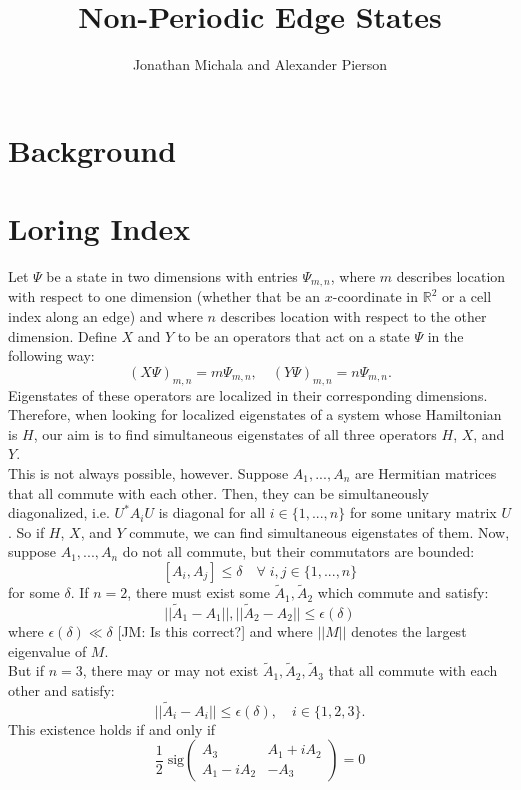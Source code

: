 \documentclass[a4paper]{article}
\title{Non-Periodic Edge States}
\author{Jonathan Michala and Alexander Pierson}
\newcommand{\jm}[1]{{\color{red} [JM: #1]}}
\begin{document}
\maketitle

\section{Background}
\section{Loring Index}
Let $\Psi$ be a state in two dimensions with entries $\Psi_{m,n}$, where $m$ describes location with respect to one dimension (whether that be an $x$-coordinate in $\mathbb{R}^2$ or a cell index along an edge) and where $n$ describes location with respect to the other dimension.
Define $X$ and $Y$ to be an operators that act on a state $\Psi$ in the following way:
$$(X \Psi)_{m,n} = m\Psi_{m,n}, \quad (Y \Psi)_{m,n} = n\Psi_{m,n}.$$
Eigenstates of these operators are localized in their corresponding dimensions.
Therefore, when looking for localized eigenstates of a system whose Hamiltonian is $H$, our aim is to find simultaneous eigenstates of all three operators $H$, $X$, and $Y$.\\
This is not always possible, however.
Suppose $A_1,...,A_n$ are Hermitian matrices that all commute with each other.
Then, they can be simultaneously diagonalized, i.e. $U^* A_i U$ is diagonal for all $i \in \{1,...,n\}$ for some unitary matrix $U$.
So if $H$, $X$, and $Y$ commute, we can find simultaneous eigenstates of them.
Now, suppose $A_1,...,A_n$ do not all commute, but their commutators are bounded:
$$[A_i,A_j] \leq \delta \quad \forall\; i,j \in \{1,...,n\}$$
for some $\delta$.
If $n = 2$, there must exist some $\widetilde{A}_1, \widetilde{A}_2$ which commute and satisfy:
$$||\widetilde{A}_1 - A_1||, ||\widetilde{A}_2 - A_2|| \leq \epsilon(\delta)$$
where $\epsilon(\delta) \ll \delta$ \jm{Is this correct?} and where $||M||$ denotes the largest eigenvalue of $M$.\\
But if $n = 3$, there may or may not exist $\widetilde{A}_1, \widetilde{A}_2, \widetilde{A}_3$ that all commute with each other and satisfy:
$$||\widetilde{A}_i - A_i|| \leq \epsilon(\delta), \quad i \in \{1,2,3\}.$$
This existence holds if and only if
$$\frac{1}{2}\; \text{sig} \begin{pmatrix}
A_3 & A_1 + iA_2\\
A_1 - iA_2 & - A_3
\end{pmatrix} = 0$$
\end{document}
